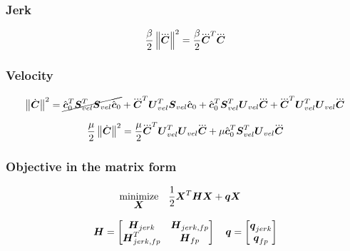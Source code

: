 \subsubsection{Jerk}
\begin{equation*}
    \frac{\beta}{2}  \norm{\cJerk}^2 = \frac{\beta}{2} \cJerk^T \cJerk
\end{equation*}


\subsubsection{Velocity}
\begin{equation*}
    \norm{\cVel}^2 = 
%
%
    \cancel{\cstate_0^T \M{S}_{vel}^T \M{S}_{vel} \cstate_0}
    +    \cJerk^T \M{U}_{vel}^T \M{S}_{vel} \cstate_0
    +    \cstate_0^T \M{S}_{vel}^T \M{U}_{vel} \cJerk
    +    \cJerk^T \M{U}_{vel}^T \M{U}_{vel} \cJerk
\end{equation*}

\begin{equation*}
    \frac{\mu}{2}  \norm{\cVel}^2 = 
        \frac{\mu}{2} \cJerk^T \M{U}_{vel}^T \M{U}_{vel} \cJerk
        +
        \mu \cstate_0^T \M{S}_{vel}^T \M{U}_{vel} \cJerk
\end{equation*}


\subsubsection{Objective in the matrix form}
\begin{equation*}
\begin{split}
    \underset{\mbox{\boldmath $X$}}{\operatorname{minimize}}\quad    & \frac{1}{2} \mbox{\boldmath $X$}^T\mbox{\boldmath $H$}\mbox{\boldmath $X$} + \mbox{\boldmath $q$} \mbox{\boldmath $X$}
\end{split}
\end{equation*}

\begin{equation*}
\mbox{\boldmath $H$} = 
    \begin{bmatrix}
        \mbox{\boldmath $H$}_{jerk}        &   \mbox{\boldmath $H$}_{jerk,fp}\\
        \mbox{\boldmath $H$}_{jerk,fp}^T   &   \mbox{\boldmath $H$}_{fp}
    \end{bmatrix}
\quad
\mbox{\boldmath $q$} = 
    \begin{bmatrix}
        \mbox{\boldmath $q$}_{jerk}\\
        \mbox{\boldmath $q$}_{fp}
    \end{bmatrix}
\end{equation*}

